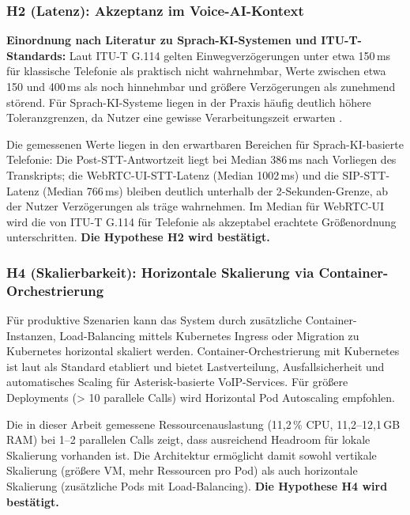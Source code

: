 \subsubsection{H2 (Latenz): Akzeptanz im Voice-AI-Kontext}

\textbf{Einordnung nach Literatur zu Sprach-\acrshort{KI}-Systemen und \acrshort{ITU-T}-Standards:} Laut \acrshort{ITU-T} G.114 \parencite{ITU-T-G114} gelten Einwegverzögerungen unter etwa 150\,ms für klassische Telefonie als praktisch nicht wahrnehmbar, Werte zwischen etwa 150 und 400\,ms als noch hinnehmbar und größere Verzögerungen als zunehmend störend. Für Sprach-\acrshort{KI}-Systeme liegen in der Praxis häufig deutlich höhere Toleranzgrenzen, da Nutzer eine gewisse Verarbeitungszeit erwarten \parencite{fathullah2023_promptaudio}.

Die gemessenen Werte liegen in den erwartbaren Bereichen für Sprach-\acrshort{KI}-basierte Telefonie: Die Post-\acrshort{STT}-Antwortzeit liegt bei Median 386\,ms nach Vorliegen des Transkripts; die \acrshort{WebRTC}-\acrshort{UI}-\acrshort{STT}-Latenz (Median 1002\,ms) und die \acrshort{SIP}-\acrshort{STT}-Latenz (Median 766\,ms) bleiben deutlich unterhalb der 2-Sekunden-Grenze, ab der Nutzer Verzögerungen als träge wahrnehmen. Im Median für \acrshort{WebRTC}-\acrshort{UI} wird die von \acrshort{ITU-T} G.114 für Telefonie als akzeptabel erachtete Größenordnung unterschritten. \textbf{Die Hypothese H2 wird bestätigt.}

\subsubsection{H4 (Skalierbarkeit): Horizontale Skalierung via Container-Orchestrierung}

Für produktive Szenarien kann das System durch zusätzliche Container-Instanzen, Load-Balancing mittels Kubernetes Ingress oder Migration zu Kubernetes horizontal skaliert werden. Container-Orchestrierung mit Kubernetes ist laut \textcite{Antonova2025} als Standard etabliert und bietet Lastverteilung, Ausfallsicherheit und automatisches Scaling für Asterisk-basierte \acrshort{VoIP}-Services. Für größere Deployments (> 10 parallele Calls) wird Horizontal Pod Autoscaling empfohlen.

Die in dieser Arbeit gemessene Ressourcenauslastung (11{,}2\,\% \acrshort{CPU}, 11{,}2--12{,}1\,GB \acrshort{RAM}) bei 1--2 parallelen Calls zeigt, dass ausreichend Headroom für lokale Skalierung vorhanden ist. Die Architektur ermöglicht damit sowohl vertikale Skalierung (größere VM, mehr Ressourcen pro Pod) als auch horizontale Skalierung (zusätzliche Pods mit Load-Balancing). \textbf{Die Hypothese H4 wird bestätigt.}

